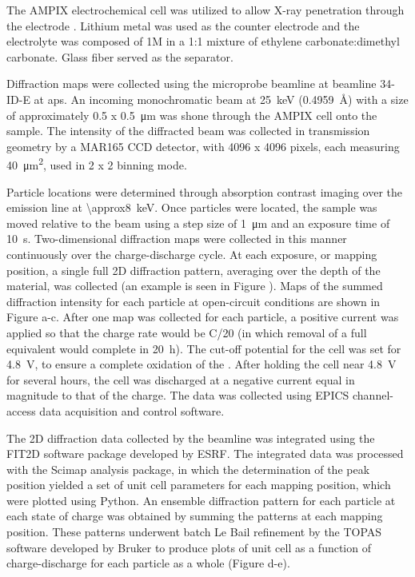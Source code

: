 \documentclass{WileyMSP-template}
\begin{document}
The AMPIX electrochemical cell was utilized to allow X-ray penetration
through the electrode \cite{borkiewicz2012}. Lithium metal was used as
the counter electrode and the electrolyte was composed of 1M
 in a 1:1 mixture of ethylene carbonate:dimethyl
carbonate. Glass fiber served as the separator.

Diffraction maps were collected using the microprobe beamline at
beamline 34-ID-E at \gls{aps}. An incoming monochromatic beam at
\SI{25}{\kilo\electronvolt} (\SI{0.4959}{\angstrom}) with a size of
approximately \num{0.5} x \SI{0.5}{\micro\meter} was shone through the
AMPIX cell onto the sample. The intensity of the diffracted beam was
collected in transmission geometry by a MAR165 CCD detector, with 4096
x 4096 pixels, each measuring \SI{40}{\square\micro\meter}, used in 2
x 2 binning mode.

Particle locations were determined through absorption contrast imaging
over the  emission line at
\SI{\approx8}{\kilo\electronvolt}. Once particles were located, the
sample was moved relative to the beam using a step size of
\SI{1}{\micro\meter} and an exposure time of
\SI{10}{\second}. Two-dimensional diffraction maps were collected in
this manner continuously over the charge-discharge cycle. At each
exposure, or mapping position, a single full 2D diffraction pattern,
averaging over the depth of the material, was collected (an example is
seen in Figure ). Maps of the summed diffraction
intensity for each particle at open-circuit conditions are shown in
Figure a-c.  After one map was collected for
each particle, a positive current was applied so that the charge rate
would be C/20 (in which removal of a full  equivalent would
complete in \SI{20}{\hour}). The cut-off potential for the cell was
set for \SI{4.8}{\volt}, to ensure a complete oxidation of the
\nca{}. After holding the cell near \SI{4.8}{\volt} for several hours,
the cell was discharged at a negative current equal in magnitude to
that of the charge. The data was collected using EPICS channel-access
data acquisition and control software.

The 2D diffraction data collected by the beamline was integrated using
the FIT2D software package developed by
ESRF\cite{hausermann1996,hammersley1997}. The integrated data was
processed with the Scimap analysis package\cite{scimap}, in which the
determination of the peak position yielded a set of unit cell
parameters for each mapping position, which were plotted using
Python. An ensemble diffraction pattern for each particle at each
state of charge was obtained by summing the patterns at each mapping
position. These patterns underwent batch Le Bail refinement by the
TOPAS software developed by Bruker to produce plots of unit cell as a
function of charge-discharge for each particle as a whole (Figure
d-e).
\end{document}
